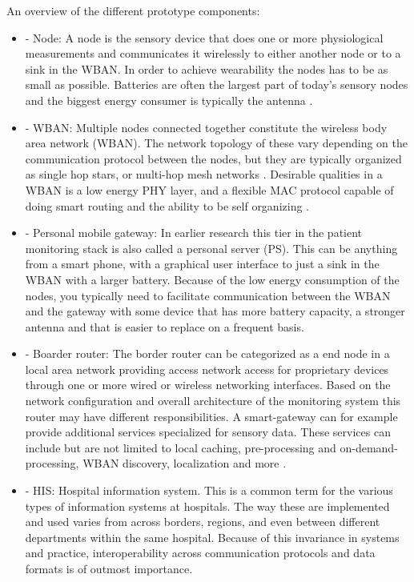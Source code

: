 
An overview of the different prototype components:
\begin{itemize}

  \item - Node: A node is the sensory device that does one or more physiological measurements and communicates it wirelessly to either another node or to a sink in the WBAN. In order to achieve wearability the nodes has to be as small as possible. Batteries are often the largest part of today’s sensory nodes and the biggest energy consumer is typically the antenna \cite{Ullah:2010ci}.

  \item - WBAN: Multiple nodes connected together constitute the wireless body area network (WBAN). The network topology of these vary depending on the communication protocol between the nodes, but they are typically organized as single hop stars, or multi-hop mesh networks \cite{Anonymous:6F6UBBK9}. Desirable qualities in a WBAN is a low energy PHY layer, and a flexible MAC protocol capable of doing smart routing and the ability to be self organizing \cite{Anonymous:XKViPHhV} \cite{Anonymous:OEjzuKTe}.

  \item - Personal mobile gateway: In earlier research this tier in the patient monitoring stack is also called a personal server (PS). This can be anything from a smart phone, with a graphical user interface to just a sink in the WBAN with a larger battery. Because of the low energy consumption of the nodes, you typically need  to facilitate communication between the WBAN and the gateway with some device that has more battery capacity, a stronger antenna and that is easier to replace on a frequent basis.

  \item - Boarder router: The border router can be categorized as a end node in a local area network providing access network access for proprietary devices through one or more wired or wireless networking interfaces. Based on the network configuration and overall architecture of the monitoring system this router may have different responsibilities. A smart-gateway can for example provide additional services specialized for sensory data. These services can include but are not limited to local caching, pre-processing and on-demand-processing, WBAN discovery, localization and more \cite{DrAmirMohammadRahmani:2014vx}.

  \item - HIS: Hospital information system. This is a common term for the various types of information systems at hospitals. The way these are implemented and used varies from across borders, regions, and even between different departments within the same hospital. Because of this invariance in systems and practice, interoperability across communication protocols and data formats is of outmost importance.

\end{itemize}

